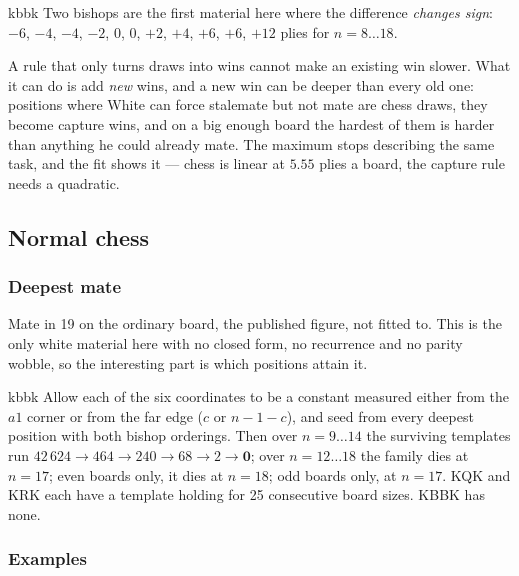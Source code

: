 \documentclass[10pt]{article}
\begin{document}
\begin{result}[title={The capture rule helps White, then stops helping and starts costing}]{kbbk}
Two bishops are the first material here where the difference \emph{changes
sign}: $-6$, $-4$, $-4$, $-2$, $0$, $0$, $+2$, $+4$, $+6$, $+6$, $+12$ plies
for $n=8\ldots18$.

A rule that only turns draws into wins cannot make an existing win slower. What
it can do is add \emph{new} wins, and a new win can be deeper than every old
one: positions where White can force stalemate but not mate are chess draws,
they become capture wins, and on a big enough board the hardest of them is
harder than anything he could already mate. The maximum stops describing the
same task, and the fit shows it --- chess is linear at $5.55$ plies a board,
the capture rule needs a quadratic.
\end{result}

\subsection{Normal chess}\label{sub:kbbk-chess}

\subsubsection{Deepest mate}\label{sub:kbbk-law}

\noindent
Mate in 19 on the ordinary board, the published figure, not fitted to. This is
the only white material here with no closed form, no recurrence and no parity
wobble, so the interesting part is which positions attain it.

\begin{result}[title={An exhaustive search that finds nothing}]{kbbk}
Allow each of the six coordinates to be a constant measured either from the
$a1$ corner or from the far edge ($c$ or $n-1-c$), and seed from every deepest
position with both bishop orderings. Then over $n=9\ldots14$ the surviving
templates run $42\,624\to464\to240\to68\to2\to\mathbf{0}$; over
$n=12\ldots18$ the family dies at $n=17$; even boards only, it dies at $n=18$;
odd boards only, at $n=17$. KQK and KRK each have a template holding for 25
consecutive board sizes. KBBK has none.
\end{result}

\subsubsection{Examples}\label{sub:kbbk-family}
\end{document}
